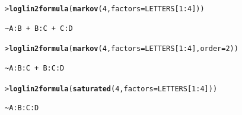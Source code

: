 \documentclass[10pt]{report}\usepackage[]{graphicx}\usepackage[]{color}
\makeatletter
\newcommand{\hlnum}[1]{\textcolor[rgb]{0.686,0.059,0.569}{#1}}%
\newcommand{\hlopt}[1]{\textcolor[rgb]{0,0,0}{#1}}%
\newcommand{\hlstd}[1]{\textcolor[rgb]{0.345,0.345,0.345}{#1}}%
\newcommand{\hlkwc}[1]{\textcolor[rgb]{0.333,0.667,0.333}{#1}}%
\newcommand{\hlkwd}[1]{\textcolor[rgb]{0.737,0.353,0.396}{\textbf{#1}}}%
\newenvironment{kframe}{%
 \def\at@end@of@kframe{}%
 \ifinner\ifhmode%
  \def\at@end@of@kframe{\end{minipage}}%
  \begin{minipage}{\columnwidth}%
 \fi\fi%
 \def\FrameCommand##1{\hskip\@totalleftmargin \hskip-\fboxsep
 \colorbox{shadecolor}{##1}\hskip-\fboxsep
     \hskip-\linewidth \hskip-\@totalleftmargin \hskip\columnwidth}%
 \MakeFramed {\advance\hsize-\width
   \@totalleftmargin\z@ \linewidth\hsize
   \@setminipage}}%
 {\par\unskip\endMakeFramed%
 \at@end@of@kframe}
\newenvironment{knitrout}{}{} %
\renewenvironment{knitrout}{\small\renewcommand{\baselinestretch}{.85}}{} %
\makeatother
\begin{document}
\begin{Exercises}
\begin{enumerate*}
\begin{ans}
\begin{knitrout}
\begin{kframe}
\begin{alltt}
\hlstd{> }\hlkwd{loglin2formula}\hlstd{(}\hlkwd{markov}\hlstd{(}\hlnum{4}\hlstd{,} \hlkwc{factors}\hlstd{=LETTERS[}\hlnum{1}\hlopt{:}\hlnum{4}\hlstd{]))}
\end{alltt}
\begin{verbatim}
~A:B + B:C + C:D
\end{verbatim}
\begin{alltt}
\hlstd{> }\hlkwd{loglin2formula}\hlstd{(}\hlkwd{markov}\hlstd{(}\hlnum{4}\hlstd{,} \hlkwc{factors}\hlstd{=LETTERS[}\hlnum{1}\hlopt{:}\hlnum{4}\hlstd{],} \hlkwc{order}\hlstd{=}\hlnum{2}\hlstd{))}
\end{alltt}
\begin{verbatim}
~A:B:C + B:C:D
\end{verbatim}
\begin{alltt}
\hlstd{> }\hlkwd{loglin2formula}\hlstd{(}\hlkwd{saturated}\hlstd{(}\hlnum{4}\hlstd{,} \hlkwc{factors}\hlstd{=LETTERS[}\hlnum{1}\hlopt{:}\hlnum{4}\hlstd{]))}
\end{alltt}
\begin{verbatim}
~A:B:C:D
\end{verbatim}
\end{kframe}
\end{knitrout}
    \end{ans}
    
  \end{enumerate*}
  

\end{Exercises}
\end{document}
